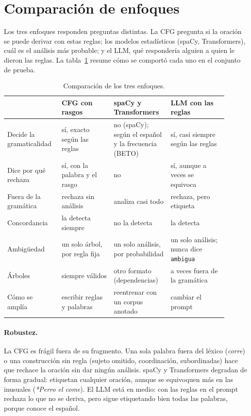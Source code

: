 \section{Comparación de enfoques}
\label{sec:comparacion_enfoques}

Los tres enfoques responden preguntas distintas. La CFG pregunta si la oración se puede derivar
con estas reglas; los modelos estadísticos (spaCy, Transformers), cuál es el análisis más
probable; y el LLM, qué respondería alguien a quien le dieron las reglas. La
tabla~\ref{tab:enfoques} resume cómo se comportó cada uno en el conjunto de prueba.

\begin{table}[h]
  \centering
  \small
  \begin{tabular}{p{0.2\linewidth}p{0.22\linewidth}p{0.24\linewidth}p{0.24\linewidth}}
    \toprule
    & CFG con rasgos & spaCy y Transformers & LLM con las reglas \\
    \midrule
    Decide la gramaticalidad & sí, exacto según las reglas & no (spaCy); según el español y la frecuencia (BETO) & sí, casi siempre según las reglas \\
    Dice por qué rechaza & sí, con la palabra y el rasgo & no & sí, aunque a veces se equivoca \\
    Fuera de la gramática & rechaza sin análisis & analiza casi todo & rechaza, pero etiqueta \\
    Concordancia & la detecta siempre & no la detecta & la detecta \\
    Ambigüedad & un solo árbol, por regla fija & un solo análisis, por probabilidad & un solo análisis; nunca dice \texttt{ambigua} \\
    Árboles & siempre válidos & otro formato (dependencias) & a veces fuera de la gramática \\
    Cómo se amplía & escribir reglas y palabras & reentrenar con un corpus anotado & cambiar el prompt \\
    \bottomrule
  \end{tabular}
  \caption{Comparación de los tres enfoques.}
  \label{tab:enfoques}
\end{table}

\paragraph{Robustez.} La CFG es frágil fuera de su fragmento. Una sola palabra fuera del léxico
(\emph{corre}) o una construcción sin regla (sujeto omitido, coordinación, subordinadas) hace que
rechace la oración sin dar ningún análisis. spaCy y Transformers degradan de forma gradual:
etiquetan cualquier oración, aunque se equivoquen más en las inusuales (\emph{*Perro el come}).
El LLM está en medio: con las reglas en el prompt rechaza lo que no se deriva, pero sigue
etiquetando bien todas las palabras, porque conoce el español.

